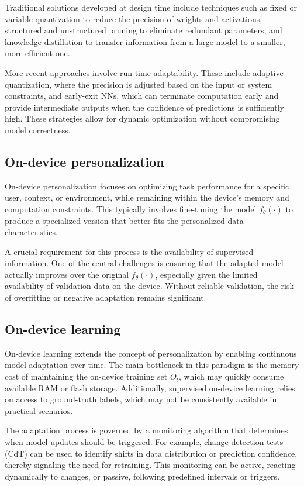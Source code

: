 Traditional solutions developed at design time include techniques such as fixed or variable quantization to reduce the precision of weights and activations, structured and unstructured pruning to eliminate redundant parameters, and knowledge distillation to transfer information from a large model to a smaller, more efficient one. 

More recent approaches involve run-time adaptability. 
These include adaptive quantization, where the precision is adjusted based on the input or system constraints, and early-exit NNs, which can terminate computation early and provide intermediate outputs when the confidence of predictions is sufficiently high. 
These strategies allow for dynamic optimization without compromising model correctness.

\subsection{On-device personalization}
On-device personalization focuses on optimizing task performance for a specific user, context, or environment, while remaining within the device's memory and computation constraints. 
This typically involves fine-tuning the model $f_\theta(\cdot)$ to produce a specialized version that better fits the personalized data characteristics.

A crucial requirement for this process is the availability of supervised information. 
One of the central challenges is ensuring that the adapted model actually improves over the original $f_\theta(\cdot)$, especially given the limited availability of validation data on the device. 
Without reliable validation, the risk of overfitting or negative adaptation remains significant.

\subsection{On-device learning}
On-device learning extends the concept of personalization by enabling continuous model adaptation over time. 
The main bottleneck in this paradigm is the memory cost of maintaining the on-device training set $O_t$, which may quickly consume available RAM or flash storage. 
Additionally, supervised on-device learning relies on access to ground-truth labels, which may not be consistently available in practical scenarios.

The adaptation process is governed by a monitoring algorithm that determines when model updates should be triggered. 
For example, change detection tests (CdT) can be used to identify shifts in data distribution or prediction confidence, thereby signaling the need for retraining. 
This monitoring can be active, reacting dynamically to changes, or passive, following predefined intervals or triggers.

